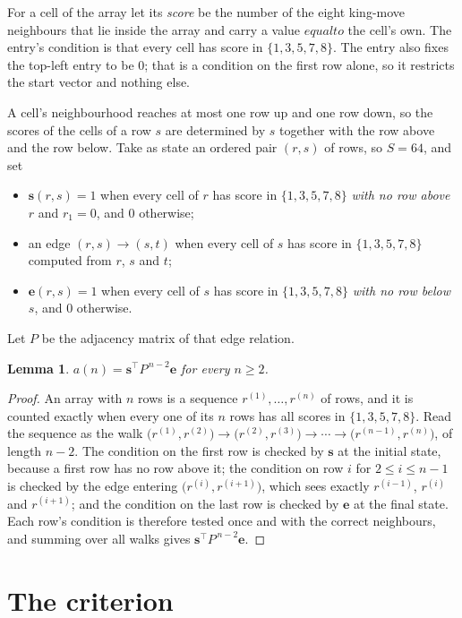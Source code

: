 \documentclass[11pt,a4paper]{article}
\theoremstyle{plain}
\newtheorem{lemma}[theorem]{Lemma}
\theoremstyle{definition}
\begin{document}
For a cell of the array let its \emph{score} be the number of the eight king-move neighbours that lie inside
the array and carry a value $equal to$ the cell's own. The entry's condition is that every cell
has score in $\{1,3,5,7,8\}$. The entry also fixes the top-left entry to be $0$; that is a condition on the first row alone, so it restricts the start vector and nothing else.

A cell's neighbourhood reaches at most one row up and one row down, so the scores of the
cells of a row $s$ are determined by $s$ together with the row above and the row below.
Take as state an ordered pair $(r,s)$ of rows, so $S=64$, and set
\begin{itemize}
\item $\mathbf{s}(r,s)=1$ when every cell of $r$ has score in $\{1,3,5,7,8\}$ \emph{with no row
above $r$} and $r_1=0$, and $0$ otherwise;
\item an edge $(r,s)\to(s,t)$ when every cell of $s$ has score in $\{1,3,5,7,8\}$ computed from
$r$, $s$ and $t$;
\item $\mathbf{e}(r,s)=1$ when every cell of $s$ has score in $\{1,3,5,7,8\}$ \emph{with no row
below $s$}, and $0$ otherwise.
\end{itemize}
Let $P$ be the adjacency matrix of that edge relation.

\begin{lemma}\label{lem:walk}
$a(n)=\mathbf{s}^{\!\top}P^{\,n-2}\mathbf{e}$ for every $n\ge2$.
\end{lemma}

\begin{proof}
An array with $n$ rows is a sequence $r^{(1)},\dots,r^{(n)}$ of rows, and it is counted
exactly when every one of its $n$ rows has all scores in $\{1,3,5,7,8\}$. Read the sequence as the
walk $\bigl(r^{(1)},r^{(2)}\bigr)\to\bigl(r^{(2)},r^{(3)}\bigr)\to\cdots\to
\bigl(r^{(n-1)},r^{(n)}\bigr)$, of length $n-2$. The condition on the first row is
checked by $\mathbf{s}$ at the initial state, because a first row has no row above it; the
condition on row $i$ for $2\le i\le n-1$ is checked by the edge entering
$\bigl(r^{(i)},r^{(i+1)}\bigr)$, which sees exactly $r^{(i-1)}$, $r^{(i)}$ and
$r^{(i+1)}$; and the condition on the last row is checked by $\mathbf{e}$ at the final
state. Each row's condition is therefore tested once and with the correct neighbours, and
summing over all walks gives $\mathbf{s}^{\!\top}P^{\,n-2}\mathbf{e}$.
\end{proof}

\section{The criterion}
\end{document}
